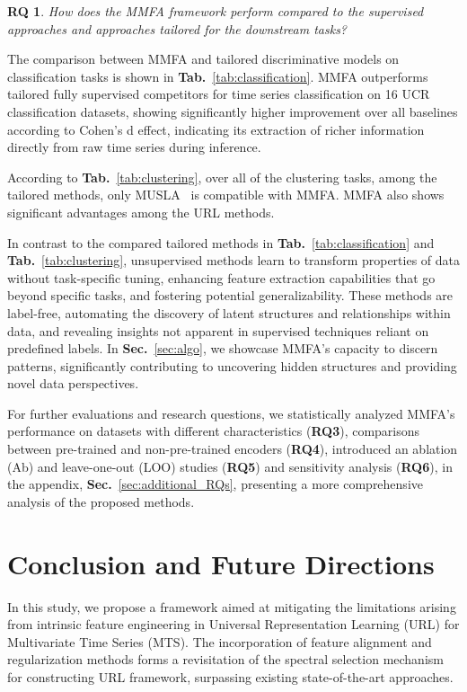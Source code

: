 \documentclass{article}
\newtheorem{researchq}{RQ}
\begin{document}
\begin{researchq}
How does the MMFA framework perform compared to the supervised approaches and approaches tailored for the downstream tasks?
\end{researchq}

The comparison between MMFA and tailored discriminative models on classification tasks is shown in \textbf{Tab.}~\ref{tab:classification}. MMFA outperforms tailored fully supervised competitors for time series classification on 16 UCR classification datasets, showing significantly higher improvement over all baselines according to Cohen's d effect, indicating its extraction of richer information directly from raw time series during inference.

According to \textbf{Tab.}~\ref{tab:clustering}, over all of the clustering tasks, among the tailored methods, only MUSLA~\cite{zhang2022multiview} is compatible with MMFA. MMFA also shows significant advantages among the URL methods.

In contrast to the compared tailored methods in \textbf{Tab.}~\ref{tab:classification} and \textbf{Tab.}~\ref{tab:clustering}, unsupervised methods learn to transform properties of data without task-specific tuning, enhancing feature extraction capabilities that go beyond specific tasks, and fostering potential generalizability. These methods are label-free, automating the discovery of latent structures and relationships within data, and revealing insights not apparent in supervised techniques reliant on predefined labels. In \textbf{Sec.}~\ref{sec:algo}, we showcase MMFA's capacity to discern patterns, significantly contributing to uncovering hidden structures and providing novel data perspectives.

For further evaluations and research questions, we statistically analyzed MMFA's performance on datasets with different characteristics (\textbf{RQ3}), comparisons between pre-trained and non-pre-trained encoders (\textbf{RQ4}), introduced an ablation (Ab) and leave-one-out (LOO) studies (\textbf{RQ5}) and sensitivity analysis (\textbf{RQ6}), in the appendix, \textbf{Sec.}~\ref{sec:additional_RQs}, presenting a more comprehensive analysis of the proposed methods.

\section{Conclusion and Future Directions}\label{sec:conc}

In this study, we propose a framework aimed at mitigating the limitations arising from intrinsic feature engineering in Universal Representation Learning (URL) for Multivariate Time Series (MTS). The incorporation of feature alignment and regularization methods forms a revisitation of the spectral selection mechanism for constructing URL framework, surpassing existing state-of-the-art approaches.
\end{document}
